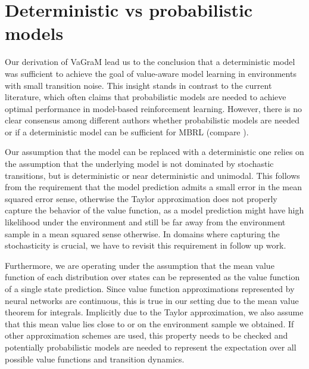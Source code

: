 \section{Deterministic vs probabilistic models}
\label{app:vagram:deterministic}

Our derivation of VaGraM lead us to the conclusion that a deterministic model was sufficient to achieve the goal of value-aware model learning in environments with small transition noise.
This insight stands in contrast to the current literature, which often claims that probabilistic models are needed to achieve optimal performance in model-based reinforcement learning.
However, there is no clear consensus among different authors whether probabilistic models are needed or if a deterministic model can be sufficient for MBRL (compare \textcite{lutter2021learning}).

Our assumption that the model can be replaced with a deterministic one relies on the assumption that the underlying model is not dominated by stochastic transitions, but is deterministic or near deterministic and unimodal. 
This follows from the requirement that the model prediction admits a small error in the mean squared error sense, otherwise the Taylor approximation does not properly capture the behavior of the value function, as a model prediction might have high likelihood under the environment and still be far away from the environment sample in a mean squared sense otherwise.
In domains where capturing the stochasticity is crucial, we have to revisit this requirement in follow up work.

Furthermore, we are operating under the assumption that the mean value function of each distribution over states can be represented as the value function of a single state prediction. 
Since value function approximations represented by neural networks are continuous, this is true in our setting due to the mean value theorem for integrals.
Implicitly due to the Taylor approximation, we also assume that this mean value lies close to or on the environment sample we obtained.
If other approximation schemes are used, this property needs to be checked and potentially probabilistic models are needed to represent the expectation over all possible value functions and transition dynamics.

